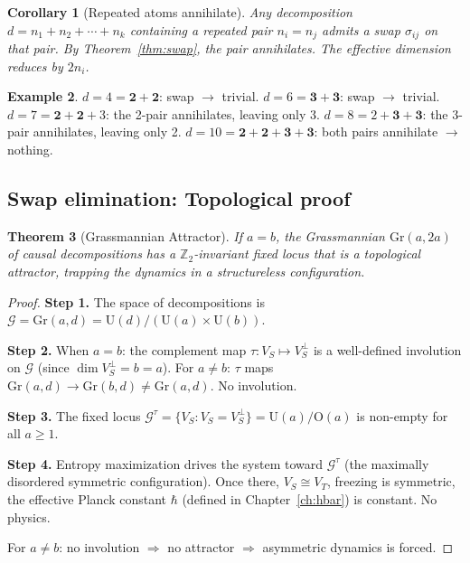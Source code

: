 \documentclass[12pt]{article}
\newtheorem{theorem}{Theorem}[section]
\newtheorem{corollary}[theorem]{Corollary}
\theoremstyle{remark}
\theoremstyle{definition}
\newtheorem{example}[theorem]{Example}
\begin{document}
\begin{corollary}[Repeated atoms annihilate]
\label{cor:annihilate}
Any decomposition $d = n_1 + n_2 + \cdots + n_k$ containing a repeated pair $n_i = n_j$ admits a swap $\sigma_{ij}$ on that pair. By Theorem~\ref{thm:swap}, the pair annihilates. The effective dimension reduces by $2n_i$.
\end{corollary}

\begin{example}
$d = 4 = \mathbf{2+2}$: swap $\to$ trivial. \;
$d = 6 = \mathbf{3+3}$: swap $\to$ trivial. \;
$d = 7 = \mathbf{2+2}+3$: the 2-pair annihilates, leaving only 3. \;
$d = 8 = 2+\mathbf{3+3}$: the 3-pair annihilates, leaving only 2. \;
$d = 10 = \mathbf{2+2}+\mathbf{3+3}$: both pairs annihilate $\to$ nothing.
\end{example}

\subsection{Swap elimination: Topological proof}

\begin{theorem}[Grassmannian Attractor]
\label{thm:grassmann}
If $a = b$, the Grassmannian $\text{Gr}(a, 2a)$ of causal decompositions has a $\mathbb{Z}_2$-invariant fixed locus that is a topological attractor, trapping the dynamics in a structureless configuration.
\end{theorem}

\begin{proof}
\textbf{Step 1.}
The space of decompositions is $\mathcal{G} = \text{Gr}(a, d) = \text{U}(d)/(\text{U}(a) \times \text{U}(b))$.

\textbf{Step 2.}
When $a = b$: the complement map $\tau: V_S \mapsto V_S^\perp$ is a well-defined involution on $\mathcal{G}$ (since $\dim V_S^\perp = b = a$). For $a \neq b$: $\tau$ maps $\text{Gr}(a, d) \to \text{Gr}(b, d) \neq \text{Gr}(a, d)$. No involution.

\textbf{Step 3.}
The fixed locus $\mathcal{G}^\tau = \{V_S : V_S = V_S^\perp\} = \text{U}(a)/\text{O}(a)$ is non-empty for all $a \geq 1$.

\textbf{Step 4.}
Entropy maximization drives the system toward $\mathcal{G}^\tau$ (the maximally disordered symmetric configuration). Once there, $V_S \cong V_T$, freezing is symmetric, the effective Planck constant $\hbar$ (defined in Chapter~\ref{ch:hbar}) is constant. No physics.

For $a \neq b$: no involution $\Rightarrow$ no attractor $\Rightarrow$ asymmetric dynamics is forced.
\end{proof}
\end{document}
